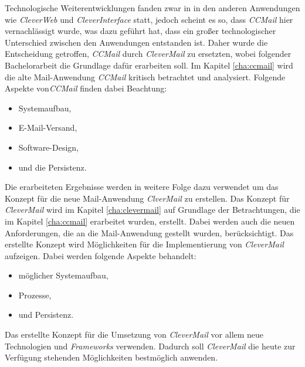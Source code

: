 Technologische Weiterentwicklungen fanden zwar in in den anderen Anwendungen wie \emph{CleverWeb} und \emph{CleverInterface} statt, jedoch scheint es so, dass \emph{CCMail} hier vernachlässigt wurde, was dazu geführt hat, dass ein großer technologischer Unterschied zwischen den Anwendungen entstanden ist. Daher wurde die Entscheidung getroffen, \emph{CCMail} durch \emph{CleverMail} zu ersetzten, wobei folgender Bachelorarbeit die Grundlage dafür erarbeiten soll.
\newline
\newline
Im Kapitel \ref{cha:ccmail} wird die alte Mail-Anwendung \emph{CCMail} kritisch betrachtet und analysiert. Folgende Aspekte von\emph{CCMail} finden dabei Beachtung:
\begin{itemize}
	\item Systemaufbau,
	\item E-Mail-Versand,
	\item Software-Design,
	\item und die Persistenz.
\end{itemize}
Die erarbeiteten Ergebnisse werden in weitere Folge dazu verwendet um das Konzept für die neue Mail-Anwendung \emph{ClverMail} zu erstellen. 
\newline
\newline
Das Konzept für \emph{CleverMail} wird im Kapitel \ref{cha:clevermail} auf Grundlage der Betrachtungen, die im Kapitel \ref{cha:ccmail} erarbeitet wurden, erstellt. Dabei werden auch die neuen Anforderungen, die an die Mail-Anwendung gestellt wurden, berücksichtigt. Das erstellte Konzept wird Möglichkeiten für die Implementierung von \emph{CleverMail} aufzeigen. Dabei werden folgende Aspekte behandelt:
\begin{itemize}
	\item möglicher Systemaufbau,
	\item Prozesse, 
	\item und Persistenz.
\end{itemize}
Das erstellte Konzept für die Umsetzung von \emph{CleverMail} vor allem neue Technologien und \emph{Frameworks} verwenden. Dadurch soll \emph{CleverMail} die heute zur Verfügung stehenden Möglichkeiten bestmöglich anwenden.